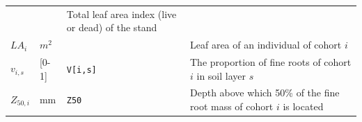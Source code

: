 \documentclass[]{book}
\begin{document}
\begin{longtable}[]{@{}llll@{}}
\begin{minipage}[t]{0.10\columnwidth}
\end{minipage} & \begin{minipage}[t]{0.12\columnwidth}\raggedright\strut
\strut
\end{minipage} & \begin{minipage}[t]{0.45\columnwidth}\raggedright\strut
Total leaf area index (live or dead) of the stand\strut
\end{minipage}\tabularnewline
\begin{minipage}[t]{0.11\columnwidth}\raggedright\strut
\(LA_{i}\)\strut
\end{minipage} & \begin{minipage}[t]{0.10\columnwidth}\raggedright\strut
\(m^{2}\)\strut
\end{minipage} & \begin{minipage}[t]{0.12\columnwidth}\raggedright\strut
\strut
\end{minipage} & \begin{minipage}[t]{0.45\columnwidth}\raggedright\strut
Leaf area of an individual of cohort \(i\)\strut
\end{minipage}\tabularnewline
\begin{minipage}[t]{0.11\columnwidth}\raggedright\strut
\(v_{i,s}\)\strut
\end{minipage} & \begin{minipage}[t]{0.10\columnwidth}\raggedright\strut
{[}0-1{]}\strut
\end{minipage} & \begin{minipage}[t]{0.12\columnwidth}\raggedright\strut
\texttt{V{[}i,s{]}}\strut
\end{minipage} & \begin{minipage}[t]{0.45\columnwidth}\raggedright\strut
The proportion of fine roots of cohort \(i\) in soil layer \(s\)\strut
\end{minipage}\tabularnewline
\begin{minipage}[t]{0.11\columnwidth}\raggedright\strut
\(Z_{50,i}\)\strut
\end{minipage} & \begin{minipage}[t]{0.10\columnwidth}\raggedright\strut
mm\strut
\end{minipage} & \begin{minipage}[t]{0.12\columnwidth}\raggedright\strut
\texttt{Z50}\strut
\end{minipage} & \begin{minipage}[t]{0.45\columnwidth}\raggedright\strut
Depth above which 50\% of the fine root mass of cohort \(i\) is
located\strut
\end{minipage}\tabularnewline

\end{longtable}
\end{document}
